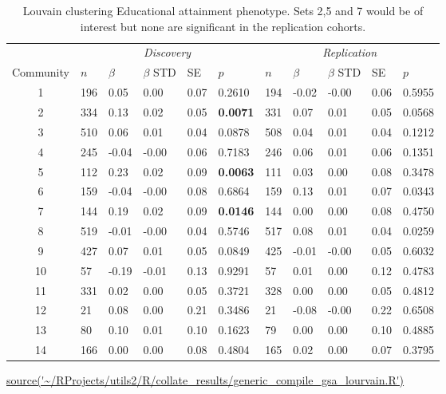 \begin{table}[ht]
\centering
\setlength{\extrarowheight}{2pt}
\begin{tabular}{cllllllllll}
  \toprule
   &  \multicolumn{5}{c}{\textit{Discovery}} & \multicolumn{5}{c}{\textit{Replication}} \\
    \cmidrule{2-11}
Community & $n$ & $\beta$ & $\beta$ STD & SE & $p$ & $n$ & $\beta$ & $\beta$ STD & SE & $p$\\ 
  \midrule
1 & 196 & 0.05 & 0.00 & 0.07 & 0.2610 & 194 & -0.02 & -0.00 & 0.06 & 0.5955 \\ 
  2 & 334 & 0.13 & 0.02 & 0.05 & \textbf{0.0071} & 331 & 0.07 & 0.01 & 0.05 & 0.0568 \\ 
  3 & 510 & 0.06 & 0.01 & 0.04 & 0.0878 & 508 & 0.04 & 0.01 & 0.04 & 0.1212 \\ 
  4 & 245 & -0.04 & -0.00 & 0.06 & 0.7183 & 246 & 0.06 & 0.01 & 0.06 & 0.1351 \\ 
  5 & 112 & 0.23 & 0.02 & 0.09 & \textbf{0.0063} & 111 & 0.03 & 0.00 & 0.08 & 0.3478 \\ 
  6 & 159 & -0.04 & -0.00 & 0.08 & 0.6864 & 159 & 0.13 & 0.01 & 0.07 & 0.0343 \\ 
  7 & 144 & 0.19 & 0.02 & 0.09 & \textbf{0.0146} & 144 & 0.00 & 0.00 & 0.08 & 0.4750 \\ 
  8 & 519 & -0.01 & -0.00 & 0.04 & 0.5746 & 517 & 0.08 & 0.01 & 0.04 & 0.0259 \\ 
  9 & 427 & 0.07 & 0.01 & 0.05 & 0.0849 & 425 & -0.01 & -0.00 & 0.05 & 0.6032 \\ 
  10 & 57 & -0.19 & -0.01 & 0.13 & 0.9291 & 57 & 0.01 & 0.00 & 0.12 & 0.4783 \\ 
  11 & 331 & 0.02 & 0.00 & 0.05 & 0.3721 & 328 & 0.00 & 0.00 & 0.05 & 0.4812 \\ 
  12 & 21 & 0.08 & 0.00 & 0.21 & 0.3486 & 21 & -0.08 & -0.00 & 0.22 & 0.6508 \\ 
  13 & 80 & 0.10 & 0.01 & 0.10 & 0.1623 & 79 & 0.00 & 0.00 & 0.10 & 0.4885 \\ 
  14 & 166 & 0.00 & 0.00 & 0.08 & 0.4804 & 165 & 0.02 & 0.00 & 0.07 & 0.3795 \\ 
   \bottomrule
\end{tabular}
\caption{Louvain clustering Educational attainment phenotype. Sets 2,5 and 7 would be of interest but none are significant in the replication cohorts.} \tiny\url{source('~/RProjects/utils2/R/collate_results/generic_compile_gsa_lourvain.R')}
\label{tab:Louvain clustering Educational attainment phenotype}
\end{table}


